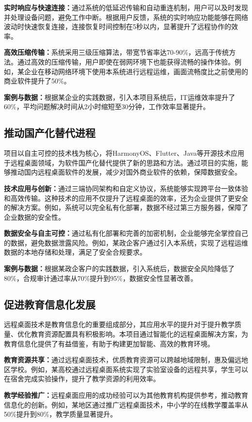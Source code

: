 \documentclass[12pt,a4paper]{article}
\begin{document}
\textbf{实时响应与快速连接：}通过系统的低延迟传输和自动重连机制，用户可以及时发现并处理设备问题，避免工作中断。根据用户反馈，系统的实时响应功能能够在网络波动时快速恢复连接，连接恢复时间控制在5秒以内，显著提升了远程协作的效率。

\textbf{高效压缩传输：}系统采用三级压缩算法，带宽节省率达70-90\%，远高于传统方法。通过高效的压缩传输，用户即使在弱网环境下也能获得流畅的操作体验。例如，某企业在移动网络环境下使用本系统进行远程运维，画面流畅度比之前使用的商业软件提升了50\%。

\textbf{案例与数据：}根据某企业的实践数据，引入本项目系统后，IT运维效率提升了60\%，平均问题解决时间从2小时缩短至30分钟，工作效率显著提升。

\subsection{推动国产化替代进程}
项目以自主可控的技术栈为核心，将HarmonyOS、Flutter、Java等开源技术应用于远程桌面领域，为软件国产化替代提供了新的思路和方法。通过项目的实施，能够推动国内远程桌面软件的发展，减少对国外商业软件的依赖，保障数据安全。

\textbf{技术应用与创新：}通过三端协同架构和自定义协议，系统能够实现跨平台一致体验和高效传输。这种技术的应用不仅提升了远程桌面的效率，还为企业提供了更安全的解决方案。例如，系统可以完全私有化部署，数据不经过第三方服务器，保障了企业数据的安全性。

\textbf{数据安全与自主可控：}通过私有化部署和完善的加密机制，企业能够完全掌控自己的数据，避免数据泄露风险。例如，某政企客户通过引入本系统，实现了远程运维数据的本地存储和处理，满足了安全合规要求。

\textbf{案例与数据：}根据某政企客户的实践数据，引入系统后，数据安全风险降低了80\%，合规审计通过率从70\%提升到95\%，数据安全性显著改善。

\subsection{促进教育信息化发展}
远程桌面技术是教育信息化的重要组成部分，其应用水平的提升对于提升教学质量、优化教育资源配置具有积极影响。本项目通过智能化的远程桌面解决方案，为教育信息化提供了有益借鉴，有助于构建更加智能、高效的教育环境。

\textbf{教育资源共享：}通过远程桌面技术，优质教育资源可以跨越地域限制，惠及偏远地区学校。例如，某高校通过远程桌面系统实现了实验室设备的远程共享，学生可以在宿舍完成实验操作，提升了教学资源的利用效率。

\textbf{教学经验推广：}远程桌面应用的成功经验可以为其他教育机构提供参考，推动教育信息化的创新。例如，某地区通过推广远程桌面技术，中小学的在线教学覆盖率从50\%提升到80\%，教学质量显著提升。
\end{document}
